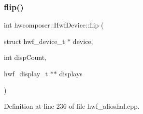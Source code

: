 \subsubsection{\texorpdfstring{flip()}{flip()}}
{\footnotesize\ttfamily int hwcomposer\+::\+Hwf\+Device\+::flip (\begin{DoxyParamCaption}\item[{struct hwf\+\_\+device\+\_\+t $\ast$}]{device,  }\item[{int}]{disp\+Count,  }\item[{hwf\+\_\+display\+\_\+t $\ast$$\ast$}]{displays }\end{DoxyParamCaption})\hspace{0.3cm}{\ttfamily [static]}}



Definition at line 236 of file hwf\+\_\+alioshal.\+cpp.


